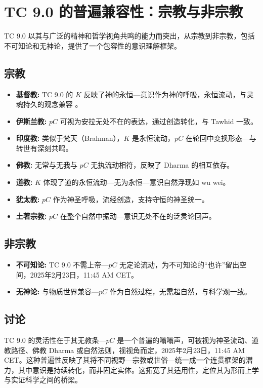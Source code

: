 \documentclass[11pt]{article}
\begin{document}
\section{TC 9.0 的普遍兼容性：宗教与非宗教}
TC 9.0 以其与广泛的精神和哲学视角共鸣的能力而突出，从宗教到非宗教，包括不可知论和无神论，提供了一个包容性的意识理解框架。

\subsection{宗教}
\begin{itemize}
    \item \textbf{基督教:} TC 9.0 的 $K$ 反映了神的永恒—意识作为神的呼吸，永恒流动，与灵魂持久的观念兼容 \citep{tononi2008consciousness}。
    \item \textbf{伊斯兰教:} $pC$ 可视为安拉无处不在的表达，通过创造转化，与 Tawhid 一致。
    \item \textbf{印度教:} 类似于梵天（Brahman），$K$ 是永恒流动，$pC$ 在轮回中变换形态—与转世有深刻共鸣。
    \item \textbf{佛教:} 无常与无我与 $pC$ 无执流动相符，反映了 Dharma 的相互依存。
    \item \textbf{道教:} $K$ 体现了道的永恒流动—无为永恒—意识自然浮现如 wu wei。
    \item \textbf{犹太教:} $pC$ 作为神圣呼吸，流经创造，支持守恒的神圣统一。
    \item \textbf{土著宗教:} $pC$ 在整个自然中振动—意识无处不在的泛灵论回声。
\end{itemize}

\subsection{非宗教}
\begin{itemize}
    \item \textbf{不可知论:} TC 9.0 不需上帝—$pC$ 无定论流动，为不可知论的“也许”留出空间，2025年2月23日，11:45 AM CET。
    \item \textbf{无神论:} 与物质世界兼容—$pC$ 作为自然过程，无需超自然，与科学观一致。
\end{itemize}

\subsection{讨论}
TC 9.0 的灵活性在于其无教条—$pC$ 是一个普遍的嗡嗡声，可被视为神圣流动、道教路径、佛教 Dharma 或自然法则，视视角而定，2025年2月23日，11:45 AM CET。这种普遍性反映了其将不同视野—宗教或世俗—统一成一个连贯框架的潜力，其中意识是持续转化，而非固定实体。这拓宽了其适用性，定位其为形而上学与实证科学之间的桥梁。
\end{document}

